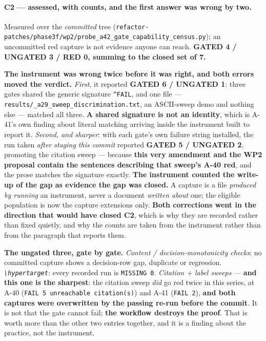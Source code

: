 \documentclass[
  10pt,
]{article}
\begin{document}
\paragraph{C2 --- assessed, with counts, and the first answer was wrong by two.}
Measured over the \emph{committed} tree (\texttt{refactor-patches/\allowbreak{}phase3f/wp2/\allowbreak{}probe\_a42\_gate\_capability\_census.py}); an uncommitted red capture is not evidence anyone can reach. \textbf{GATED 4 / UNGATED 3 / RED 0, summing to the closed set of 7.}

\textbf{The instrument was wrong twice before it was right, and both errors moved the verdict.} \emph{First}, it reported \textbf{GATED 6 / UNGATED 1}: three gates shared the generic signature \texttt{\^{}FAIL}, and one file --- \texttt{results/\allowbreak{}\_a29\_sweep\_discrimination.txt}, an ASCII-sweep demo and nothing else --- matched all three. \textbf{A shared signature is not an identity}, which is A-41's own finding about literal matching arriving inside the instrument built to report it. \emph{Second, and sharper}: with each gate's own failure string installed, the run taken \emph{after staging this commit} reported \textbf{GATED 5 / UNGATED 2}, promoting the citation sweep --- because \textbf{this very amendment and the WP2 proposal contain the sentences describing that sweep's A-40 red}, and the prose matches the signature exactly. \textbf{The instrument counted the write-up of the gap as evidence the gap was closed.} A capture is a file \emph{produced by running} an instrument, never a document \emph{written about} one; the eligible population is now the capture extensions only. \textbf{Both corrections went in the direction that would have closed C2}, which is why they are recorded rather than fixed quietly, and why the counts are taken from the instrument rather than from the paragraph that reports them.

\textbf{The ungated three, gate by gate.} \emph{Content / decision-monotonicity checks}: no committed capture shows a decision-row gap, duplicate or regression. \emph{\texttt{\textbackslash hypertarget}}: every recorded run is \texttt{MISSING 0}. \emph{Citation + label sweeps} --- \textbf{and this one is the sharpest}: the citation sweep \emph{did} go red twice in this series, at A-40 (\texttt{FAIL 5 unreachable citation(s)}) and A-41 (\texttt{FAIL 2}), \textbf{and both captures were overwritten by the passing re-run before the commit}. It is not that the gate cannot fail; \textbf{the workflow destroys the proof}. That is worth more than the other two entries together, and it is a finding about the practice, not the instrument.
\end{document}
